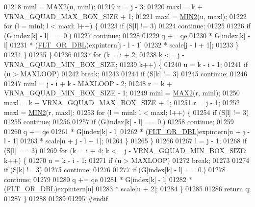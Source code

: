 \begin{DoxyCode}
01218       minl  = \hyperlink{group__utils_ga33297b3679c713b0c4d897cd0fe3b122}{MAX2}(u, minl);
01219       u     = j - 3;
01220       maxl  = k + VRNA\_GQUAD\_MAX\_BOX\_SIZE + 1;
01221       maxl  = \hyperlink{group__utils_gae0b9cd0ce090bd69b951aa73e8fa4f7d}{MIN2}(u, maxl);
01222       \textcolor{keywordflow}{for} (l = minl; l < maxl; l++) \{
01223         \textcolor{keywordflow}{if} (S[l] != 3)
01224           \textcolor{keywordflow}{continue};
01225 
01226         \textcolor{keywordflow}{if} (G[index[k] - l] == 0.)
01227           \textcolor{keywordflow}{continue};
01228 
01229         q += qe
01230              * G[index[k] - l]
01231              * (\hyperlink{group__data__structures_ga31125aeace516926bf7f251f759b6126}{FLT\_OR\_DBL})expintern[j - l - 1]
01232              * scale[j - l + 1];
01233       \}
01234     \}
01235   \}
01236 
01237   \textcolor{keywordflow}{for} (k = i + 2;
01238        k <= j - VRNA\_GQUAD\_MIN\_BOX\_SIZE;
01239        k++) \{
01240     u = k - i - 1;
01241     \textcolor{keywordflow}{if} (u > MAXLOOP)
01242       \textcolor{keywordflow}{break};
01243 
01244     \textcolor{keywordflow}{if} (S[k] != 3)
01245       \textcolor{keywordflow}{continue};
01246 
01247     minl  = j - i + k - MAXLOOP - 2;
01248     r     = k + VRNA\_GQUAD\_MIN\_BOX\_SIZE - 1;
01249     minl  = \hyperlink{group__utils_ga33297b3679c713b0c4d897cd0fe3b122}{MAX2}(r, minl);
01250     maxl  = k + VRNA\_GQUAD\_MAX\_BOX\_SIZE + 1;
01251     r     = j - 1;
01252     maxl  = \hyperlink{group__utils_gae0b9cd0ce090bd69b951aa73e8fa4f7d}{MIN2}(r, maxl);
01253     \textcolor{keywordflow}{for} (l = minl; l < maxl; l++) \{
01254       \textcolor{keywordflow}{if} (S[l] != 3)
01255         \textcolor{keywordflow}{continue};
01256 
01257       \textcolor{keywordflow}{if} (G[index[k] - l] == 0.)
01258         \textcolor{keywordflow}{continue};
01259 
01260       q += qe
01261            * G[index[k] - l]
01262            * (\hyperlink{group__data__structures_ga31125aeace516926bf7f251f759b6126}{FLT\_OR\_DBL})expintern[u + j - l - 1]
01263            * scale[u + j - l + 1];
01264     \}
01265   \}
01266 
01267   l = j - 1;
01268   \textcolor{keywordflow}{if} (S[l] == 3)
01269     \textcolor{keywordflow}{for} (k = i + 4; k <= j - VRNA\_GQUAD\_MIN\_BOX\_SIZE; k++) \{
01270       u = k - i - 1;
01271       \textcolor{keywordflow}{if} (u > MAXLOOP)
01272         \textcolor{keywordflow}{break};
01273 
01274       \textcolor{keywordflow}{if} (S[k] != 3)
01275         \textcolor{keywordflow}{continue};
01276 
01277       \textcolor{keywordflow}{if} (G[index[k] - l] == 0.)
01278         \textcolor{keywordflow}{continue};
01279 
01280       q += qe
01281            * G[index[k] - l]
01282            * (\hyperlink{group__data__structures_ga31125aeace516926bf7f251f759b6126}{FLT\_OR\_DBL})expintern[u]
01283            * scale[u + 2];
01284     \}
01285 
01286   \textcolor{keywordflow}{return} q;
01287 \}
01288 
01289 
01295 \textcolor{preprocessor}{#endif}
\end{DoxyCode}
